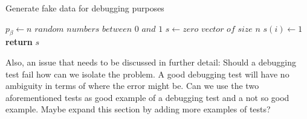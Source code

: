 \documentclass[paper=a4, fontsize=11pt]{scrartcl}
\numberwithin{equation}{section}		%
\numberwithin{figure}{section}			%
\numberwithin{table}{section}				%
\begin{document}
\begin{algorithm}
\caption{Generate fake data for debugging purposes}\label{alg:generate_fake_data}
\begin{algorithmic}[1]
\State $p_{\beta} \gets \textit{$n$ random numbers between 0 and 1} $
\State $s \gets \textit{zero vector of size $n$}$
 
\State $s(i) \gets 1$ 
\EndIf
\EndFor
\State \textbf{return} $s$
\EndProcedure
\end{algorithmic}
\end{algorithm}

Also, an  issue that needs to be discussed in further detail: Should a debugging test fail how can we isolate the problem.  A good debugging test will have no ambiguity in terms of where the error might be. Can we use the two aforementioned tests as good example of a debugging test and a not so good example. Maybe expand this section by adding more examples of tests?  
\end{document}
